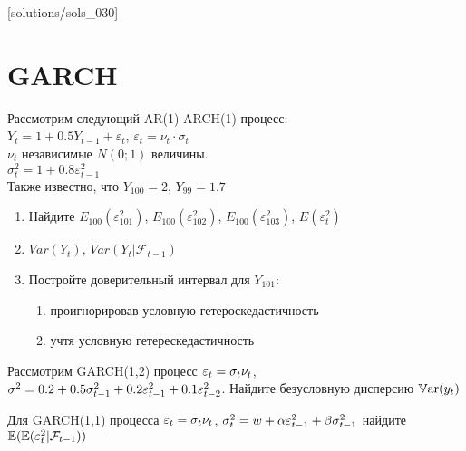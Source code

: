 
[solutions/sols_030]

\chapter{GARCH}



\begin{problem}
Рассмотрим следующий AR(1)-ARCH(1) процесс: \\
$Y_{t}=1+0.5Y_{t-1}+\varepsilon_{t}$, $\varepsilon_{t}=\nu_{t}\cdot \sigma_{t}$ \\
$\nu_{t}$ независимые $N(0;1)$ величины. \\
$\sigma^{2}_{t}=1+0.8\varepsilon^{2}_{t-1}$\\
Также известно, что $Y_{100}=2$, $Y_{99}=1.7$
\begin{enumerate}
\item Найдите $E_{100}(\varepsilon^{2}_{101})$, $E_{100}(\varepsilon^{2}_{102})$, $E_{100}(\varepsilon^{2}_{103})$, $E(\varepsilon^{2}_{t})$
\item $Var(Y_{t})$, $Var(Y_{t}|\mathcal{F}_{t-1})$
\item Постройте доверительный интервал для $Y_{101}$:
\begin{enumerate}
\item проигнорировав условную гетероскедастичность
\item учтя условную гетерескедастичность
\end{enumerate}
\end{enumerate}
\begin{sol}
\end{sol}
\end{problem}




\begin{problem}
Рассмотрим GARCH(1,2) процесс $\varepsilon_t=\sigma_t \nu_t$, $\sigma^2=0.2+0.5\sigma^2_{t-1}+0.2\varepsilon_{t-1}^2+0.1\varepsilon_{t-2}^2$. Найдите безусловную дисперсию $\mathbb{V}\mathrm{ar}(y_t)$
\begin{sol}

\end{sol}
\end{problem}


\begin{problem}
Для GARCH(1,1) процесса $\varepsilon_t=\sigma_t \nu_t$, $\sigma^2_{t}= w + \alpha \varepsilon_{t-1}^2+ \beta \sigma^2_{t-1}$ найдите $\mathbb{E}( \mathbb{E}(\varepsilon_t^2 | \mathcal{F}_{t-1} ) )$
\begin{sol}

\end{sol}
\end{problem}



